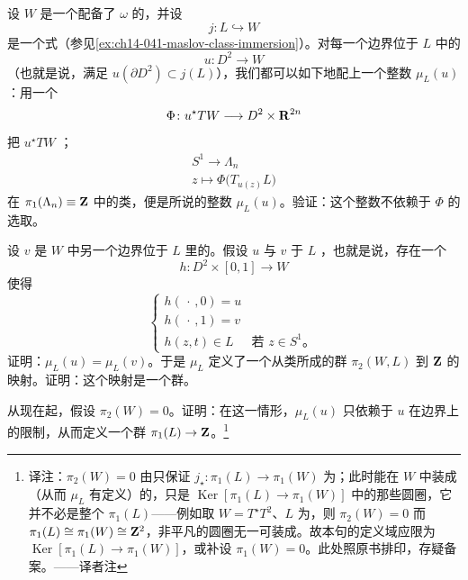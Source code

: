 \begin{exercise}[\trRelative\trMaslovIndex]\label{ex:ch14-042-relative-maslov-index}
设 $W$ 是一个配备了\trSymplecticForm{} $\omega$ 的\trManifold，并设
\[
j\colon L\hookrightarrow W
\]
是一个\trLagrange{}式\trEmbedding（参见\cref{ex:ch14-041-maslov-class-immersion}）。对每一个边界位于 $L$ 中的\trDisk
\[
u\colon D^{2}\longrightarrow W
\]
（也就是说，满足 $u(\partial D^{2})\subset j(L)$），我们都可以如下地配上一个整数 $\mu_L(u)$：用一个\trSymplectic\trTrivialization
\[
\Phi\colon u^{\star}TW\longrightarrow D^{2}\times\mathbf{R}^{2n}
\]
把 $u^{\star}TW$ \trTrivialization；\trLoop
\[
\begin{array}{c}
S^{1}\longrightarrow\Lambda_n\\
z\longmapsto\Phi\bigl(T_{u(z)}L\bigr)
\end{array}
\]
在 $\pi_1(\Lambda_n)\equiv\mathbf{Z}$ 中的类，便是所说的整数 $\mu_L(u)$。验证：这个整数不依赖于\trTrivialization{} $\Phi$ 的选取。

设 $v$ 是 $W$ 中另一个边界位于 $L$ 里的\trDisk。假设 $u$ 与 $v$ \trRelative{}于 $L$ \trHomotopic，也就是说，存在一个\trHomotopy
\[
h\colon D^{2}\times[0,1]\longrightarrow W
\]
使得
\[
\begin{cases}
h(\,\cdot\,,0)=u\\
h(\,\cdot\,,1)=v\\
h(z,t)\in L & \text{若 } z\in S^{1}\text{。}
\end{cases}
\]
证明：$\mu_L(u)=\mu_L(v)$。于是 $\mu_L$ 定义了一个从\trRelative\trHomotopy{}类所成的群 $\pi_2(W,L)$ 到 $\mathbf{Z}$ 的映射。证明：这个映射是一个群\trHomomorphism。

从现在起，假设 $\pi_2(W)=0$。证明：在这一情形，$\mu_L(u)$ 只依赖于 $u$ 在边界上的限制，从而定义一个群\trHomomorphism{} $\pi_1(L)\to\mathbf{Z}$。\footnote{译注：$\pi_2(W)=0$ 由\trLongExactSequence{}只保证 $j_\star\colon\pi_1(L)\to\pi_1(W)$ 为\trInjective；此时能在 $W$ 中装成\trDisk{}（从而 $\mu_L$ 有定义）的，只是 $\operatorname{Ker}[\pi_1(L)\to\pi_1(W)]$ 中的那些圆圈，它并不必是整个 $\pi_1(L)$——例如取 $W=T^{\star}T^{2}$、$L$ 为\trZeroSection，则 $\pi_2(W)=0$ 而 $\pi_1(L)\cong\pi_1(W)\cong\mathbf{Z}^2$，非平凡的圆圈无一可装成\trDisk。故本句的定义域应限为 $\operatorname{Ker}[\pi_1(L)\to\pi_1(W)]$，或补设 $\pi_1(W)=0$。此处照原书排印，存疑备案。——译者注}
\end{exercise}

